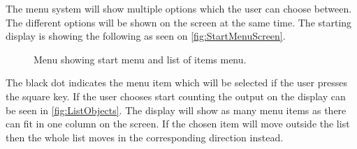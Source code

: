 The menu system will show multiple options which the user can choose between. The different options will be shown on the screen at the same time. The starting display is showing the following as seen on \cref{fig:StartMenuScreen}.

\begin{figure}[H]
	\centering
	\hfill
	\caption{Menu showing start menu and list of items menu.}	
\end{figure}


The black dot indicates the menu item which will be selected if the user presses the square key. If the user chooses start counting the output on the display can be seen in \cref{fig:ListObjects}. The display  will show as many menu items as there can fit in one column on the screen. If the chosen item will move outside the list then the whole list moves in the corresponding direction instead.


